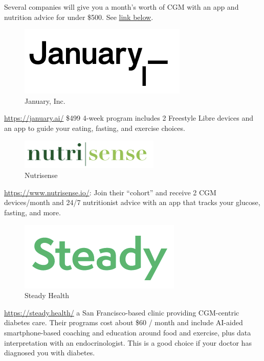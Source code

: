 \documentclass[
]{book}
\begin{document}
Several companies will give you a month's worth of CGM with an app and nutrition advice for under \$500. See \protect\hyperlink{bookmark=id.d7g3e8qlegnl}{link below}.

\begin{figure}
\centering
\includegraphics{images/january-logo.png}
\caption{January, Inc.}
\end{figure}

\url{https://january.ai/} \$499 4-week program includes 2 Freestyle Libre devices and an app to guide your eating, fasting, and exercise choices.

\begin{figure}
\centering
\includegraphics{images/nutrisense-logo.png}
\caption{Nutrisense}
\end{figure}

\url{https://www.nutrisense.io/}: Join their ``cohort'' and receive 2 CGM devices/month and 24/7 nutritionist advice with an app that tracks your glucose, fasting, and more.

\begin{figure}
\centering
\includegraphics{images/steadyhealth-logo.png}
\caption{Steady Health}
\end{figure}

\url{https://steady.health/} a San Francisco-based clinic providing CGM-centric diabetes care. Their programs cost about \$60 / month and include AI-aided smartphone-based coaching and education around food and exercise, plus data interpretation with an endocrinologist. This is a good choice if your doctor has diagnosed you with diabetes.
\end{document}
